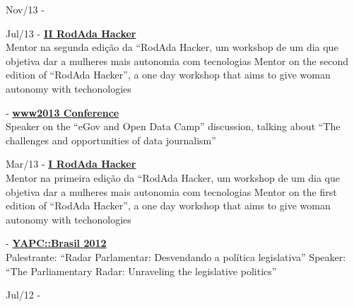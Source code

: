 \documentclass[]{friggeri-cv}
\begin{document}
{\footnotesize{Nov/13}} - \href{http://2.encontro.dados.gov.br/encontro.html}{\textbf{}}\\

{\footnotesize{Jul/13}} - \href{http://rodadahacker.com/}{\textbf{II RodAda Hacker}}\\
%
{Mentor na segunda edição da ``RodAda Hacker, um workshop de um dia que objetiva dar a mulheres mais autonomia com tecnologias}%
{Mentor on the second edition of ``RodAda Hacker'', a one day workshop that aims to give woman autonomy with techonologies}

{\footnotesize{}} - \href{http://www2013.org/}{\textbf{www2013 Conference}}\\
%
{Speaker on the ``eGov and Open Data Camp'' discussion, talking about ``The challenges and opportunities of data journalism''}

{\footnotesize{Mar/13}} - \href{http://rodadahacker.com/}{\textbf{I RodAda Hacker}}\\
%
{Mentor na primeira edição da ``RodAda Hacker, um workshop de um dia que objetiva dar a mulheres mais autonomia com tecnologias}%
{Mentor on the first edition of ``RodAda Hacker'', a one day workshop that aims to give woman autonomy with techonologies}

{\footnotesize{}} - \href{http://yapcbrasil.org.br/2012/talk/110}{\textbf{YAPC::Brasil 2012}}\\
%
{Palestrante: ``Radar Parlamentar: Desvendando a política legislativa''}%
{Speaker: ``The Parliamentary Radar: Unraveling the legislative politics''}

{\footnotesize{Jul/12}} - \href{http://softwarelivre.org/fisl13}{\textbf{}}\\
\end{document}
